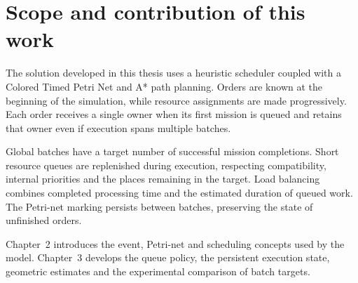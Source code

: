 


\section{Scope and contribution of this work}

The solution developed in this thesis uses a heuristic scheduler coupled
with a Colored Timed Petri Net and A* path planning. Orders are known at
the beginning of the simulation, while resource assignments are made
progressively. Each order receives a single owner when its first mission
is queued and retains that owner even if execution spans multiple batches.

Global batches have a target number of successful mission completions.
Short resource queues are replenished during execution, respecting
compatibility, internal priorities and the places remaining in the target.
Load balancing combines completed processing time and the estimated duration
of queued work. The Petri-net marking persists between batches, preserving
the state of unfinished orders.

Chapter~2 introduces the event, Petri-net and scheduling concepts used by
the model. Chapter~3 develops the queue policy, the persistent execution
state, geometric estimates and the experimental comparison of batch targets.

